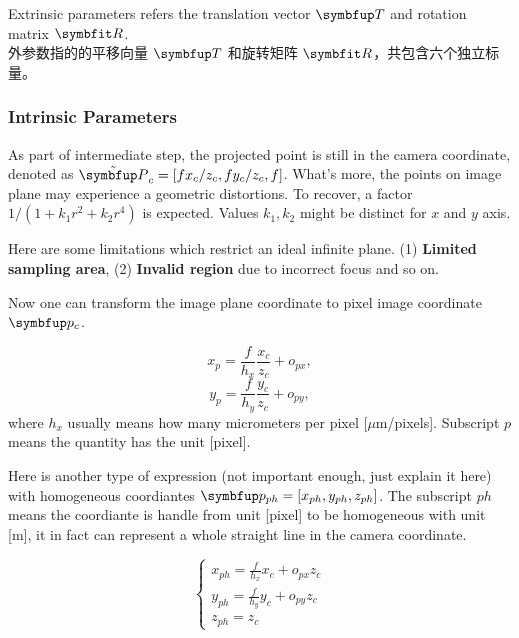 \begin{definition}
Extrinsic parameters refers the translation vector $\Vect{T}$ and rotation matrix $\Matr{R}$.\\
外参数指的的平移向量 $\Vect{T}$ 和旋转矩阵 $\Matr{R}$，共包含六个独立标量。
\end{definition}

\subsubsection{Intrinsic Parameters}

As part of intermediate step, the projected point is still in the camera coordinate, denoted as $\tilde{\Vect{P}}_c=[f x_c/z_c, f  y_c/z_c, f]$. What's more, the points on image plane may experience a geometric distortions. To recover, a factor $1/(1+k_1 r^2+k_2 r^4)$ is expected.
Values $k_1, k_2$ might be distinct for $x$ and $y$ axis. 

Here are some limitations which restrict an ideal infinite plane. (1) \textbf{Limited sampling area}, (2) \textbf{Invalid region} due to incorrect focus and so on. 


Now one can transform the image plane coordinate to pixel image coordinate $\Vect{p}_c$. 

$$x_p=\frac{f}{h_x} \frac{x_c}{z_c}+o_{px},$$
$$y_p=\frac{f}{h_y} \frac{y_c}{z_c}+o_{py},$$
where $h_x$ usually means how many micrometers per pixel [$\mu$m/pixels]. Subscript $p$ means the quantity has the unit [pixel].

Here is another type of expression (not important enough, just explain it  here) with homogeneous coordiantes $\Vect{p}_{ph}=[x_{ph},y_{ph},z_{ph}]$. The subscript $ph$ means the coordiante is handle from unit [pixel] to be homogeneous with unit [m], it in fact can represent a whole straight line in the camera coordinate.

\begin{equation}
\left\{\begin{array}{l}
	{x_{ph}=\frac{f}{h_{x}} x_c+o_{px} z_c} \\ 
	{y_{ph}=\frac{f}{h_{y}} y_c+o_{py} z_c} \\ 
	{z_{ph}=z_c}
	\end{array}\right.
\end{equation}

